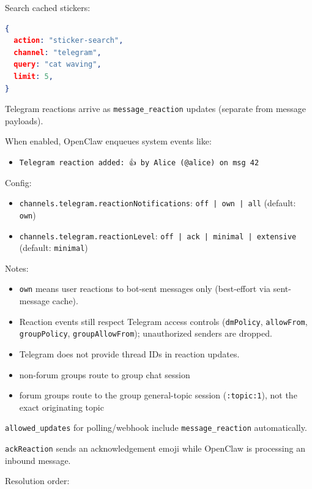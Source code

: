 Search cached stickers:

\begin{lstlisting}[language=json]
{
  action: "sticker-search",
  channel: "telegram",
  query: "cat waving",
  limit: 5,
}
\end{lstlisting}



Telegram reactions arrive as \texttt{message\_reaction} updates (separate from message payloads).

When enabled, OpenClaw enqueues system events like:

\begin{itemize}
  \item \texttt{Telegram reaction added: 👍 by Alice (@alice) on msg 42}
\end{itemize}


Config:

\begin{itemize}
  \item \texttt{channels.telegram.reactionNotifications}: \texttt{off | own | all} (default: \texttt{own})
  \item \texttt{channels.telegram.reactionLevel}: \texttt{off | ack | minimal | extensive} (default: \texttt{minimal})
\end{itemize}


Notes:

\begin{itemize}
  \item \texttt{own} means user reactions to bot-sent messages only (best-effort via sent-message cache).
  \item Reaction events still respect Telegram access controls (\texttt{dmPolicy}, \texttt{allowFrom}, \texttt{groupPolicy}, \texttt{groupAllowFrom}); unauthorized senders are dropped.
  \item Telegram does not provide thread IDs in reaction updates.
  \item non-forum groups route to group chat session
  \item forum groups route to the group general-topic session (\texttt{:topic:1}), not the exact originating topic
\end{itemize}


\texttt{allowed\_updates} for polling/webhook include \texttt{message\_reaction} automatically.


\texttt{ackReaction} sends an acknowledgement emoji while OpenClaw is processing an inbound message.

Resolution order:

